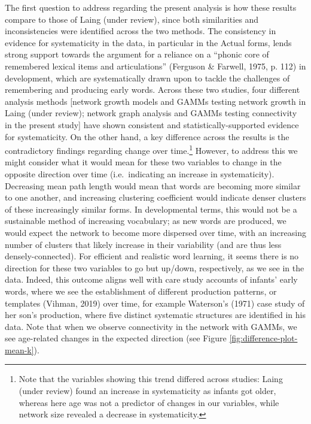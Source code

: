 \documentclass[
  man]{apa6}
\begin{document}
The first question to address regarding the present analysis is how these results compare to those of Laing (under review), since both similarities and inconsistencies were identified across the two methods. The consistency in evidence for systematicity in the data, in particular in the Actual forms, lends strong support towards the argument for a reliance on a ``phonic core of remembered lexical items and articulations'' (Ferguson \& Farwell, 1975, p. 112) in development, which are systematically drawn upon to tackle the challenges of remembering and producing early words. Across these two studies, four different analysis methods {[}network growth models and GAMMs testing network growth in Laing (under review); network graph analysis and GAMMs testing connectivity in the present study{]} have shown consistent and statistically-supported evidence for systematicity. On the other hand, a key difference across the results is the contradictory findings regarding change over time.\footnote{Note that the variables showing this trend differed across studies: Laing (under review) found an increase in systematicity as infants got older, whereas here age was not a predictor of changes in our variables, while network size revealed a decrease in systematicity.} However, to address this we might consider what it would mean for these two variables to change in the opposite direction over time (i.e.~indicating an increase in systematicity). Decreasing mean path length would mean that words are becoming more similar to one another, and increasing clustering coefficient would indicate denser clusters of these increasingly similar forms. In developmental terms, this would not be a sustainable method of increasing vocabulary; as new words are produced, we would expect the network to become more dispersed over time, with an increasing number of clusters that likely increase in their variability (and are thus less densely-connected). For efficient and realistic word learning, it seems there is no direction for these two variables to go but up/down, respectively, as we see in the data. Indeed, this outcome aligns well with care study accounts of infants' early words, where we see the establishment of different production patterns, or templates (Vihman, 2019) over time, for example Waterson's (1971) case study of her son's production, where five distinct systematic structures are identified in his data. Note that when we observe connectivity in the network with GAMMs, we see age-related changes in the expected direction (see Figure \ref{fig:difference-plot-mean-k}).
\end{document}
